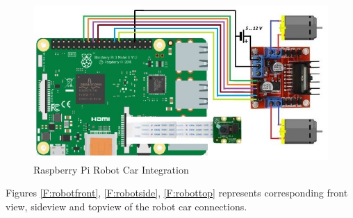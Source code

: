 \documentclass[sigconf]{acmart}
\begin{document}
\begin{figure}[htb]
  \includegraphics[width=1.0\columnwidth]{images/RaspPi_Robot.jpg}
  \caption{Raspberry Pi Robot Car Integration}\label{F:circuit}
\end{figure}

Figures \ref{F:robotfront}, \ref{F:robotside}, \ref{F:robottop}  represents corresponding front view, sideview and topview of the robot car connections.
\end{document}
